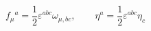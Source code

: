 \begin{equation}
f_\mu{}^a = \frac{1}{2} \varepsilon^{abc} \omega_{\mu,bc}, \qquad
\eta^a = \frac{1}{2} \varepsilon^{abc} \eta_c
\end{equation}


